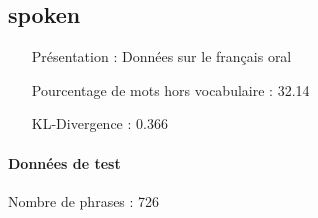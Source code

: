 \subsection{spoken } 
 \begin{itemize} 
 \item[Présentation :] Données sur le français oral

 \item[Pourcentage de mots hors vocabulaire : ]32.14
 \item[KL-Divergence :]0.366
 \end{itemize}  \paragraph{Données de test \\ }  
 Nombre de phrases : 726\\ 

